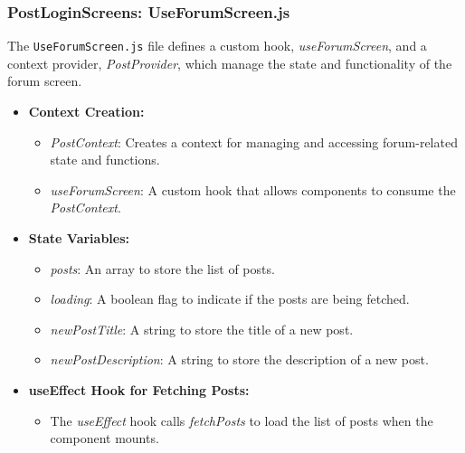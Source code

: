 \subsubsection{PostLoginScreens: UseForumScreen.js}

The \texttt{UseForumScreen.js} file defines a custom hook, \textit{useForumScreen}, and a context provider, \textit{PostProvider}, which manage the state and functionality of the forum screen.

\begin{itemize}
    \item \textbf{Context Creation:}
    \begin{itemize}
        \item \textit{PostContext}: Creates a context for managing and accessing forum-related state and functions.
        \item \textit{useForumScreen}: A custom hook that allows components to consume the \textit{PostContext}.
    \end{itemize}

    \item \textbf{State Variables:}
    \begin{itemize}
        \item \textit{posts}: An array to store the list of posts.
        \item \textit{loading}: A boolean flag to indicate if the posts are being fetched.
        \item \textit{newPostTitle}: A string to store the title of a new post.
        \item \textit{newPostDescription}: A string to store the description of a new post.
    \end{itemize}

    \item \textbf{useEffect Hook for Fetching Posts:}
    \begin{itemize}
        \item The \textit{useEffect} hook calls \textit{fetchPosts} to load the list of posts when the component mounts.
    \end{itemize}


\end{itemize}
